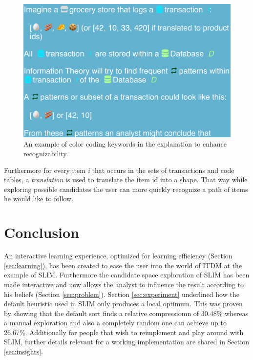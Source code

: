 \documentclass[runningheads]{llncs}
\begin{document}
\begin{figure}[H]
\center
\includegraphics[width=1\linewidth]{img/color_coding.png}
\caption{An example of color coding keywords in the explanation to enhance recognizability.}
\label{fig:colors}
\end{figure}
Furthermore for every item \emph{i} that occurs in the sets of transactions and code tables, a \emph{translation} is used to translate the item id into a shape. That way while exploring possible candidates the user can more quickly recognize a path of items he would like to follow.


\section{Conclusion}
An interactive learning experience, optimized for learning efficiency (Section \ref{sec:learning}), has been created to ease the user into the world of ITDM at the example of SLIM.
Furthermore the candidate space exploration of SLIM has been made interactive and now allows the analyst to influence the result according to his beliefs (Section \ref{sec:problem}). Section \ref{sec:experiment} underlined how the default heuristic used in SLIM only produces a local optimum. This was proven by showing that the default sort finds a relative compressiomn of 30.48\% whereas a manual exploration and also a completely random one can achieve up to 26.67\%.
Additionally for people that wish to reimplement and play around with SLIM, further details relevant for a working implementation are shared in Section \ref{sec:insights}.

%
%
%


%
\end{document}

